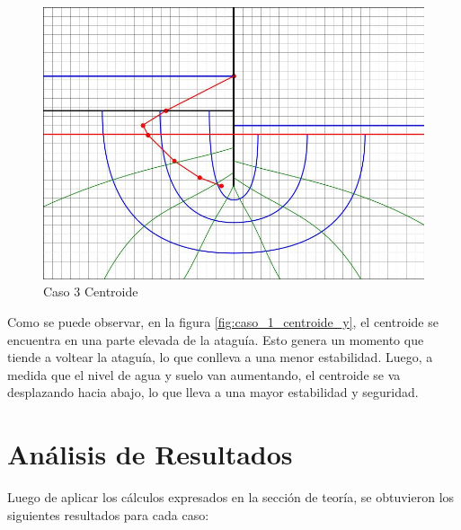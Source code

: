 \begin{figure}[H]
\begin{minipage}{0.32\textwidth}
        \includegraphics[width=\textwidth]{GRAFICOS/caso_3_centroide_y.jpg}
        \caption{Caso 3 Centroide}
        \label{fig:caso_3_centroide_y}
    \end{minipage}
\end{figure}

Como se puede observar, en la figura \ref{fig:caso_1_centroide_y}, el centroide se encuentra en una parte elevada de la ataguía. Esto genera un momento que tiende a voltear la ataguía, lo que conlleva a una menor estabilidad. Luego, a medida que el nivel de agua y suelo van aumentando, el centroide se va desplazando hacia abajo, lo que lleva a una mayor estabilidad y seguridad. 

\section{Análisis de Resultados}

Luego de aplicar los cálculos expresados en la sección de teoría, se obtuvieron los siguientes resultados para cada caso:

